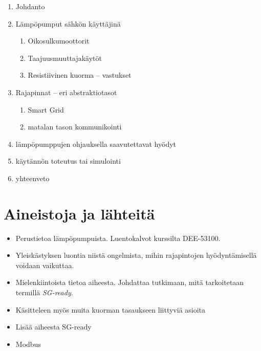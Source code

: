\begin{enumerate}
  \item Johdanto
  \item Lämpöpumput sähkön käyttäjinä
    \begin{enumerate}
      \item Oikosulkumoottorit
      \item Taajuusmuuttajakäytöt
      \item Resistiivinen kuorma -- vastukset
    \end{enumerate}
  \item Rajapinnat -- eri abstraktiotasot
  \begin{enumerate}
    \item Smart Grid
    \item matalan tason kommunikointi
  \end{enumerate}
  \item lämpöpumppujen ohjauksella saavutettavat hyödyt
  \item käytännön toteutus tai simulointi
  \item yhteenveto
\end{enumerate}



\section{Aineistoja ja lähteitä}
  \begin{itemize}
    \item Perustietoa lämpöpumpuista. Luentokalvot kurssilta DEE-53100. \parencite{kummu}
    \item Yleiskästyksen luontia niistä ongelmista, mihin rajapintojen hyödyntämisellä voidaan vaikuttaa. \parencite[Luku 3]{rautiainen}
    \item Mielenkiintoista tietoa aiheesta. Johdattaa tutkimaan, mitä tarkoitetaan termillä \emph{SG-ready}. \parencite{ModelBasedFlexibilityAssessment}
    \item Käsitteleen myös muita kuorman tasaukseen liittyviä asioita \parencite{ShenJiangLi}
    \item Lisää aiheesta SG-ready \parencite{fischerTriebelSelinger}
    \item Modbus \parencite{sousaPortugal}
  \end{itemize}

